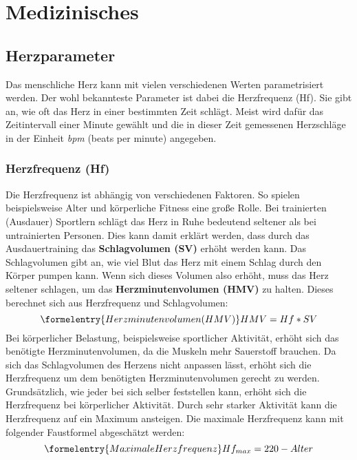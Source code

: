 
\chapter{Medizinisches}

\section{Herzparameter}
Das menschliche Herz kann mit vielen verschiedenen Werten parametrisiert werden. Der wohl bekannteste Parameter ist dabei die Herzfrequenz (Hf). Sie gibt an, wie oft das Herz in einer bestimmten Zeit schlägt. Meist wird dafür das Zeitintervall einer Minute gewählt und die in dieser Zeit gemessenen Herzschläge in der Einheit \emph{bpm} (beats per minute) angegeben. 
\subsection{Herzfrequenz (Hf)} \label {subsec:hf}
Die Herzfrequenz ist abhängig von verschiedenen Faktoren. So spielen beispielsweise Alter und körperliche Fitness eine große Rolle. Bei trainierten (Ausdauer) Sportlern schlägt das Herz in Ruhe bedeutend seltener als bei untrainierten Personen. Dies kann damit erklärt werden, dass durch das Ausdauertraining das \textbf{Schlagvolumen (SV)} erhöht werden kann. Das Schlagvolumen gibt an, wie viel Blut das Herz mit einem Schlag durch den Körper pumpen kann. Wenn sich dieses Volumen also erhöht, muss das Herz seltener schlagen, um das \textbf{Herzminutenvolumen (HMV)} zu halten. Dieses berechnet sich aus Herzfrequenz und Schlagvolumen:
\begin{equation}\formelentry{Herzminutenvolumen (HMV)}
	HMV = Hf * SV
\end{equation} 
Bei körperlicher Belastung, beispielsweise sportlicher Aktivität, erhöht sich das benötigte Herzminutenvolumen, da die Muskeln mehr Sauerstoff brauchen. Da sich das Schlagvolumen des Herzens nicht anpassen lässt, erhöht sich die Herzfrequenz um dem benötigten Herzminutenvolumen gerecht zu werden. Grundsätzlich, wie jeder bei sich selber feststellen kann, erhöht sich die Herzfrequenz bei körperlicher Aktivität. Durch sehr starker Aktivität kann die Herzfrequenz auf ein Maximum ansteigen. Die maximale Herzfrequenz kann mit folgender Faustformel abgeschätzt werden: 
\begin{equation}\formelentry{Maximale Herzfrequenz}
	Hf_{max} = 220 - Alter
\end{equation}
